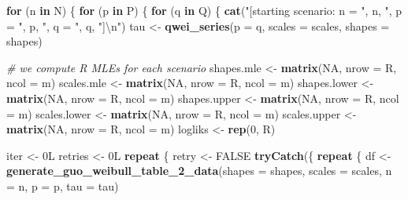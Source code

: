 \documentclass[
]{article}
\newenvironment{Shaded}{\begin{snugshade}}{\end{snugshade}}
\newcommand{\CharTok}[1]{\textcolor[rgb]{0.31,0.60,0.02}{#1}}
\newcommand{\CommentTok}[1]{\textcolor[rgb]{0.56,0.35,0.01}{\textit{#1}}}
\newcommand{\ControlFlowTok}[1]{\textcolor[rgb]{0.13,0.29,0.53}{\textbf{#1}}}
\newcommand{\DataTypeTok}[1]{\textcolor[rgb]{0.13,0.29,0.53}{#1}}
\newcommand{\DecValTok}[1]{\textcolor[rgb]{0.00,0.00,0.81}{#1}}
\newcommand{\KeywordTok}[1]{\textcolor[rgb]{0.13,0.29,0.53}{\textbf{#1}}}
\newcommand{\NormalTok}[1]{#1}
\newcommand{\OtherTok}[1]{\textcolor[rgb]{0.56,0.35,0.01}{#1}}
\newcommand{\StringTok}[1]{\textcolor[rgb]{0.31,0.60,0.02}{#1}}
\begin{document}
\begin{Shaded}
\begin{Highlighting}[]
\ControlFlowTok{for}\NormalTok{ (n }\ControlFlowTok{in}\NormalTok{ N) \{}
    \ControlFlowTok{for}\NormalTok{ (p }\ControlFlowTok{in}\NormalTok{ P) \{}
        \ControlFlowTok{for}\NormalTok{ (q }\ControlFlowTok{in}\NormalTok{ Q) \{}
            \KeywordTok{cat}\NormalTok{(}\StringTok{"[starting scenario: n = "}\NormalTok{, n, }\StringTok{", p = "}\NormalTok{, p, }\StringTok{", q = "}\NormalTok{,}
\NormalTok{                q, }\StringTok{"]}\CharTok{\textbackslash{}n}\StringTok{"}\NormalTok{)}
\NormalTok{            tau \textless{}{-}}\StringTok{ }\KeywordTok{qwei\_series}\NormalTok{(}\DataTypeTok{p =}\NormalTok{ q, }\DataTypeTok{scales =}\NormalTok{ scales, }\DataTypeTok{shapes =}\NormalTok{ shapes)}

            \CommentTok{\# we compute R MLEs for each scenario}
\NormalTok{            shapes.mle \textless{}{-}}\StringTok{ }\KeywordTok{matrix}\NormalTok{(}\OtherTok{NA}\NormalTok{, }\DataTypeTok{nrow =}\NormalTok{ R, }\DataTypeTok{ncol =}\NormalTok{ m)}
\NormalTok{            scales.mle \textless{}{-}}\StringTok{ }\KeywordTok{matrix}\NormalTok{(}\OtherTok{NA}\NormalTok{, }\DataTypeTok{nrow =}\NormalTok{ R, }\DataTypeTok{ncol =}\NormalTok{ m)}
\NormalTok{            shapes.lower \textless{}{-}}\StringTok{ }\KeywordTok{matrix}\NormalTok{(}\OtherTok{NA}\NormalTok{, }\DataTypeTok{nrow =}\NormalTok{ R, }\DataTypeTok{ncol =}\NormalTok{ m)}
\NormalTok{            shapes.upper \textless{}{-}}\StringTok{ }\KeywordTok{matrix}\NormalTok{(}\OtherTok{NA}\NormalTok{, }\DataTypeTok{nrow =}\NormalTok{ R, }\DataTypeTok{ncol =}\NormalTok{ m)}
\NormalTok{            scales.lower \textless{}{-}}\StringTok{ }\KeywordTok{matrix}\NormalTok{(}\OtherTok{NA}\NormalTok{, }\DataTypeTok{nrow =}\NormalTok{ R, }\DataTypeTok{ncol =}\NormalTok{ m)}
\NormalTok{            scales.upper \textless{}{-}}\StringTok{ }\KeywordTok{matrix}\NormalTok{(}\OtherTok{NA}\NormalTok{, }\DataTypeTok{nrow =}\NormalTok{ R, }\DataTypeTok{ncol =}\NormalTok{ m)}
\NormalTok{            logliks \textless{}{-}}\StringTok{ }\KeywordTok{rep}\NormalTok{(}\DecValTok{0}\NormalTok{, R)}

\NormalTok{            iter \textless{}{-}}\StringTok{ }\NormalTok{0L}
\NormalTok{            retries \textless{}{-}}\StringTok{ }\NormalTok{0L}
            \ControlFlowTok{repeat}\NormalTok{ \{}
\NormalTok{                retry \textless{}{-}}\StringTok{ }\OtherTok{FALSE}
                \KeywordTok{tryCatch}\NormalTok{(\{}
                  \ControlFlowTok{repeat}\NormalTok{ \{}
\NormalTok{                    df \textless{}{-}}\StringTok{ }\KeywordTok{generate\_guo\_weibull\_table\_2\_data}\NormalTok{(}\DataTypeTok{shapes =}\NormalTok{ shapes,}
                      \DataTypeTok{scales =}\NormalTok{ scales, }\DataTypeTok{n =}\NormalTok{ n, }\DataTypeTok{p =}\NormalTok{ p, }\DataTypeTok{tau =}\NormalTok{ tau)}


\end{Highlighting}
\end{Shaded}
\end{document}
